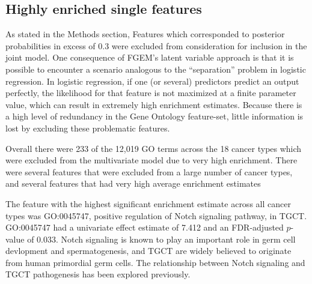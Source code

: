 \subsection{Highly enriched single features}\label{sec:org530c0fc}

As stated in the Methods section, Features which corresponded to posterior probabilities in excess of 0.3 were excluded from consideration for inclusion in the joint model.  One consequence of FGEM's latent variable approach
is that it is possible to encounter a scenario analogous to the ``separation'' problem in logistic regression.  In logistic regression, if one (or several) predictors predict an output perfectly, the likelihood for that 
feature is not maximized at a finite parameter value, which can result in extremely high enrichment estimates.  Because there is a high level of redundancy in the Gene Ontology feature-set, little information is lost by excluding these problematic features.  

Overall there were 233 of the 12,019 GO terms across the 18 cancer types which were excluded from the multivariate model due to very high enrichment.  There were several features that were excluded from a large number of cancer types, and several features that had very high average enrichment estimates

The feature with the highest significant enrichment estimate across all cancer types was GO:0045747, positive regulation of Notch signaling pathway, in TGCT.  GO:0045747 had a univariate effect estimate of 7.412 and an FDR-adjusted $p$-value of 0.033.  Notch signaling is known to play an important role in germ cell devlopment and spermatogenesis\cite{Huang_2013}, and TGCT are widely believed to originate from human primordial germ cells\cite{baroni19_origin_testic_germ_cell_tumor}.  The relationship between Notch signaling and TGCT pathogenesis has been explored previously\cite{hayashi04_expres_failur_notch_signal_system}.

